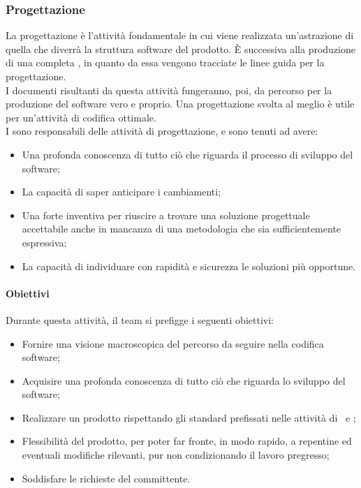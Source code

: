 	\subsubsection{Progettazione}
	La progettazione è l'attività fondamentale in cui viene realizzata un'astrazione di quella che diverrà la struttura software del prodotto. \MakeUppercase{è} successiva alla produzione di una completa \AdR, in quanto da essa vengono tracciate le linee guida per la progettazione.\\
	I documenti risultanti da questa attività fungeranno, poi, da percorso per la produzione del software vero e proprio. Una progettazione svolta al meglio è utile per un'attività di codifica ottimale.\\
	I \textit{\Progs} sono responsabili delle attività di progettazione, e sono tenuti ad avere:
	\begin{itemize}
		\item Una profonda conoscenza di tutto ciò che riguarda il processo di sviluppo del software;
		\item La capacità di saper anticipare i cambiamenti;
		\item Una forte inventiva per riuscire a trovare una soluzione progettuale accettabile anche in mancanza di una metodologia che sia sufficientemente espressiva;
		\item La capacità di individuare con rapidità e sicurezza le soluzioni più opportune.
	\end{itemize}
	
		\paragraph{Obiettivi}
		Durante questa attività, il team si prefigge i seguenti obiettivi:
		\begin{itemize}
			\item Fornire una visione macroscopica del percorso da seguire nella codifica software;
			\item Acquisire una profonda conoscenza di tutto ciò che riguarda lo sviluppo del software;
			\item Realizzare un prodotto rispettando gli standard prefissati nelle attività di \SdF\ e \AdR;
			\item Flessibilità del prodotto, per poter far fronte, in modo rapido, a repentine ed eventuali modifiche rilevanti, pur non condizionando il lavoro pregresso;
			\item Soddisfare le richieste del committente.
		\end{itemize}
		
